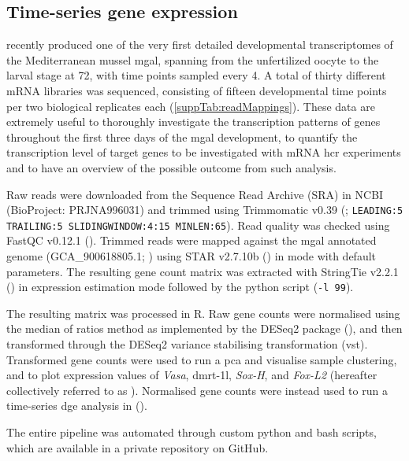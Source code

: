 \subsection{Time-series gene expression}
 recently produced one of the very first detailed developmental transcriptomes of the Mediterranean mussel \gls{mgal}, spanning from the unfertilized oocyte to the larval stage at \qty{72}{\hpf}, with time points sampled every \qty{4}{\hpf}. A total of thirty different mRNA libraries was sequenced, consisting of fifteen developmental time points per two biological replicates each (\cref{suppTab:readMappings}). These data are extremely useful to thoroughly investigate the transcription patterns of genes throughout the first three days of the \gls{mgal} development, to quantify the transcription level of target genes to be investigated with mRNA \gls{hcr} experiments and to have an overview of the possible outcome from such analysis.

Raw reads were downloaded from the Sequence Read Archive (SRA) in NCBI (BioProject: PRJNA996031) and trimmed using Trimmomatic v0.39 (; \verb|LEADING:5| \verb|TRAILING:5 SLIDINGWINDOW:4:15 MINLEN:65|). Read quality was checked using FastQC v0.12.1 (). Trimmed reads were mapped against the \gls{mgal} annotated genome (GCA\_900618805.1; ) using STAR v2.7.10b () in  mode with default parameters. The resulting gene count matrix was extracted with StringTie v2.2.1 () in expression estimation mode followed by the python script  (\verb|-l 99|).

The resulting matrix was processed in R. Raw gene counts were normalised using the median of ratios method as implemented by the DESeq2 package (), and then transformed through the DESeq2 variance stabilising transformation (vst). Transformed gene counts were used to run a \gls{pca} and visualise sample clustering, and to plot expression values of \textit{Vasa}, \gls{dmrt-1l}, \textit{Sox-H}, and \textit{Fox-L2} (hereafter collectively referred to as ). Normalised gene counts were instead used to run a time-series \gls{dge} analysis in  ().

The entire pipeline was automated through custom python and bash scripts, which are available in a private repository on GitHub.

